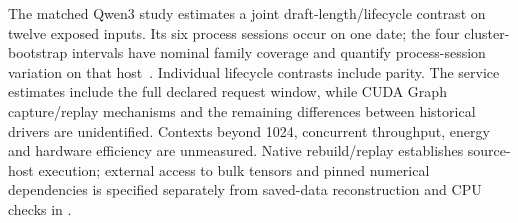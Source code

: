 The matched Qwen3 study estimates a joint draft-length/lifecycle contrast on twelve exposed inputs. Its six process sessions occur on one date; the four cluster-bootstrap intervals have nominal family coverage and quantify process-session variation on that host~\cite{rtxnativebridge}. Individual lifecycle contrasts include parity. The service estimates include the full declared request window, while CUDA Graph capture/replay mechanisms and the remaining differences between historical drivers are unidentified. Contexts beyond 1024, concurrent throughput, energy and hardware efficiency are unmeasured. Native rebuild/replay establishes source-host execution; external access to bulk tensors and pinned numerical dependencies is specified separately from saved-data reconstruction and CPU checks in .
